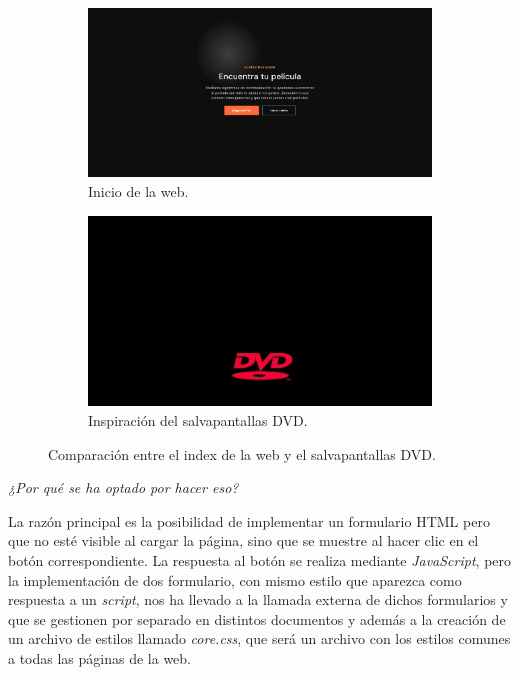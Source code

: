 \documentclass[a4paper, 12pt]{report}
\begin{document}
    \begin{figure}[h!]
        \centering
        \begin{subfigure}{0.45\textwidth}
            \includegraphics[width=\textwidth]{resources/img/index.png}
            \caption{Inicio de la web.}
            \label{fig:index}
        \end{subfigure}
        \hfill
        \begin{subfigure}{0.45\textwidth}
            \includegraphics[width=\textwidth]{resources/img/salvapantallasdvd.png}
            \caption{Inspiración del salvapantallas DVD.}
            \label{fig:savescreen}
        \end{subfigure}
        \caption{Comparación entre el index de la web y el salvapantallas DVD.}
        \label{fig:comparacion}
    \end{figure}

    \textit{¿Por qué se ha optado por hacer eso?}

    La razón principal es la posibilidad de implementar un formulario HTML pero que no esté visible al cargar la página, sino que se muestre al hacer clic en el botón correspondiente. La respuesta al botón se realiza mediante \textit{JavaScript}, pero la implementación de dos formulario, con mismo estilo que aparezca como respuesta a un \textit{script}, nos ha llevado a la llamada externa de dichos formularios y que se gestionen por separado en distintos documentos y además a la creación de un archivo de estilos llamado \textit{core.css}, que será un archivo con los estilos comunes a todas las páginas de la web.
\end{document}
